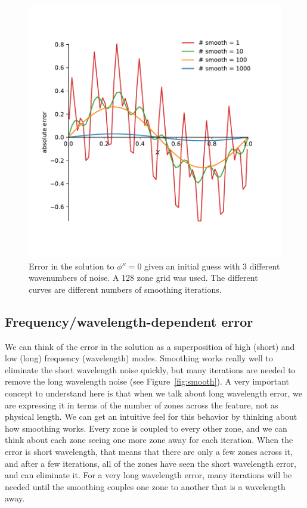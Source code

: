 \begin{figure}[t]
\centering
\includegraphics[width=0.8\linewidth]{smooth-multimode}
\caption[Smoothing of different wavenumbers]{\label{fig:mg:smooth}
  Error in the solution to $\phi'' = 0$ given an initial guess with 3
  different wavenumbers of noise.  A 128 zone grid was used.  The
  different curves are different numbers of smoothing
  iterations. \\ }
\end{figure}

\subsection{Frequency/wavelength-dependent error}

We can think of the error in the solution as a superposition of high
(short) and low (long) frequency (wavelength) modes.  Smoothing works
really well to eliminate the short wavelength noise quickly, but many
iterations are needed to remove the long wavelength noise (see
Figure~\ref{fig:smooth}).  A very important concept to understand here
is that when we talk about long wavelength error, we are expressing it
in terms of the number of zones across the feature, not as physical
length.  We can get an intuitive feel for this behavior by thinking
about how smoothing works.  Every zone is coupled to every other zone,
and we can think about each zone seeing one more zone away for each
iteration.  When the error is short wavelength, that means that there
are only a few zones across it, and after a few iterations, all of the
zones have seen the short wavelength error, and can eliminate it.  For
a very long wavelength error, many iterations will be needed until the
smoothing couples one zone to another that is a wavelength away.

